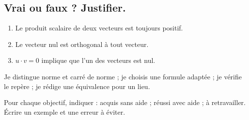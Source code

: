 \subsection*{Vrai ou faux ? Justifier.}\label{C03-VF}
\begin{enumerate}
\item Le produit scalaire de deux vecteurs est toujours positif.
\item Le vecteur nul est orthogonal à tout vecteur.
\item $u\cdot v=0$ implique que l’un des vecteurs est nul.
\end{enumerate}
\begin{keypoint}Je distingue norme et carré de norme ; je choisis une formule adaptée ; je vérifie le repère ; je rédige une équivalence pour un lieu.

Pour chaque objectif, indiquer : acquis sans aide ; réussi avec aide ; à retravailler. Écrire un exemple et une erreur à éviter.\end{keypoint}
\endgroup
\ifmxteacher{}\fi
